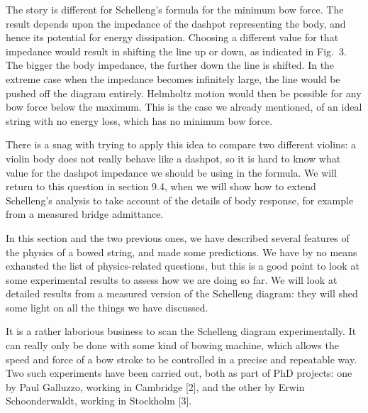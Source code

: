   The story is different for Schelleng’s formula for the minimum bow force. The 
  result depends upon the impedance of the dashpot representing the body, and 
  hence its potential for energy dissipation. Choosing a different value for 
  that impedance would result in shifting the line up or down, as indicated in 
  Fig.\ 3. The bigger the body impedance, the further down the line is shifted. 
  In the extreme case when the impedance becomes infinitely large, the line 
  would be pushed off the diagram entirely. Helmholtz motion would then be 
  possible for any bow force below the maximum. This is the case we already 
  mentioned, of an ideal string with no energy loss, which has no minimum bow 
  force. 


  There is a snag with trying to apply this idea to compare two different 
  violins: a violin body does not really behave like a dashpot, so it is hard 
  to know what value for the dashpot impedance we should be using in the 
  formula. We will return to this question in section 9.4, when we will show 
  how to extend Schelleng’s analysis to take account of the details of body 
  response, for example from a measured bridge admittance. 

  In this section and the two previous ones, we have described several features 
  of the physics of a bowed string, and made some predictions. We have by no 
  means exhausted the list of physics-related questions, but this is a good 
  point to look at some experimental results to assess how we are doing so far. 
  We will look at detailed results from a measured version of the Schelleng 
  diagram: they will shed some light on all the things we have discussed. 

  It is a rather laborious business to scan the Schelleng diagram 
  experimentally. It can really only be done with some kind of bowing machine, 
  which allows the speed and force of a bow stroke to be controlled in a 
  precise and repeatable way. Two such experiments have been carried out, both 
  as part of PhD projects: one by Paul Galluzzo, working in Cambridge [2], and 
  the other by Erwin Schoonderwaldt, working in Stockholm [3]. 

